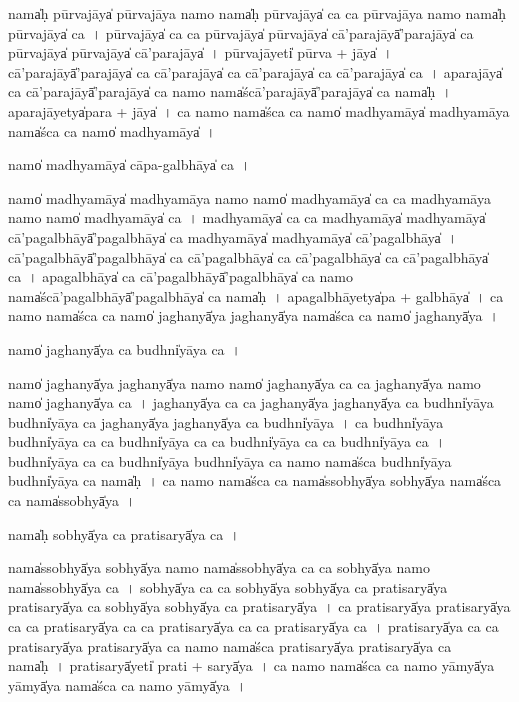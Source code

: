 \documentclass[parskip, DIV=14]{scrartcl}
\begin{document}
{nama̍ḥ pūrva॒jāya̍ pūrva॒jāya॒ namo॒ nama̍ḥ pūrva॒jāya̍ ca ca pūrva॒jāya॒ namo॒ nama̍ḥ pūrva॒jāya̍ ca~।
pū॒rva॒jāya̍ ca ca pūrva॒jāya̍ pūrva॒jāya̍ cā'para॒jāyā̍'para॒jāya̍ ca pūrva॒jāya̍ pūrva॒jāya̍ cā'para॒jāya̍~।
pū॒rva॒jāyeti̍ pūrva + jāya̍~।
cā॒'pa॒ra॒jāyā̍'para॒jāya̍ ca cā'para॒jāya̍ ca cā'para॒jāya̍ ca cā'para॒jāya̍ ca~।
a॒pa॒ra॒jāya̍ ca cā'para॒jāyā̍'para॒jāya̍ ca॒ namo॒ nama̍ścā'para॒jāyā̍'para॒jāya̍ ca॒ nama̍ḥ~।
a॒pa॒ra॒jāyetya̍para + jāya̍~।
ca॒ namo॒ nama̍śca ca॒ namo̍ madhya॒māya̍ madhya॒māya॒ nama̍śca ca॒ namo̍ madhya॒māya̍~।

namo̍ madhya॒māya̍ cāpa-ga॒lbhāya̍ ca॒~।

namo̍ madhya॒māya̍ madhya॒māya॒ namo॒ namo̍ madhya॒māya̍ ca ca madhya॒māya॒ namo॒ namo̍ madhya॒māya̍ ca~।
ma॒dhya॒māya̍ ca ca madhya॒māya̍ madhya॒māya̍ cā'paga॒lbhāyā̍'paga॒lbhāya̍ ca madhya॒māya̍ madhya॒māya̍ cā'paga॒lbhāya̍~।
cā॒'pa॒ga॒lbhāyā̍'paga॒lbhāya̍ ca cā'paga॒lbhāya̍ ca cā'paga॒lbhāya̍ ca cā'paga॒lbhāya̍ ca~।
a॒pa॒ga॒lbhāya̍ ca cā'paga॒lbhāyā̍'paga॒lbhāya̍ ca॒ namo॒ nama̍ścā'paga॒lbhāyā̍'paga॒lbhāya̍ ca॒ nama̍ḥ~।
a॒pa॒ga॒lbhāyetya̍pa + ga॒lbhāya̍~।
ca॒ namo॒ nama̍śca ca॒ namo̍ jagha॒nyā̍ya jagha॒nyā̍ya॒ nama̍śca ca॒ namo̍ jagha॒nyā̍ya~।

namo̍ jagha॒nyā̍ya ca॒ budhni̍yāya ca॒~।

namo̍ jagha॒nyā̍ya jagha॒nyā̍ya॒ namo॒ namo̍ jagha॒nyā̍ya ca ca jagha॒nyā̍ya॒ namo॒ namo̍ jagha॒nyā̍ya ca~।
ja॒gha॒nyā̍ya ca ca jagha॒nyā̍ya jagha॒nyā̍ya ca॒ budhni̍yāya॒ budhni̍yāya ca jagha॒nyā̍ya jagha॒nyā̍ya ca॒ budhni̍yāya~।
ca॒ budhni̍yāya॒ budhni̍yāya ca ca॒ budhni̍yāya ca ca॒ budhni̍yāya ca ca॒ budhni̍yāya ca~।
budhni̍yāya ca ca॒ budhni̍yāya॒ budhni̍yāya ca॒ namo॒ nama̍śca॒ budhni̍yāya॒ budhni̍yāya ca॒ nama̍ḥ~।
ca॒ namo॒ nama̍śca ca॒ nama̍sso॒bhyā̍ya so॒bhyā̍ya॒ nama̍śca ca॒ nama̍sso॒bhyā̍ya~।

nama̍ḥ so॒bhyā̍ya ca pratisa॒ryā̍ya ca॒~।

nama̍sso॒bhyā̍ya so॒bhyā̍ya॒ namo॒ nama̍sso॒bhyā̍ya ca ca so॒bhyā̍ya॒ namo॒ nama̍sso॒bhyā̍ya ca~।
so॒bhyā̍ya ca ca so॒bhyā̍ya so॒bhyā̍ya ca pratisa॒ryā̍ya pratisa॒ryā̍ya ca so॒bhyā̍ya so॒bhyā̍ya ca pratisa॒ryā̍ya~।                                                                                                                                  
ca॒ pra॒ti॒sa॒ryā̍ya pratisa॒ryā̍ya ca ca pratisa॒ryā̍ya ca ca pratisa॒ryā̍ya ca ca pratisa॒ryā̍ya ca~।
pra॒ti॒sa॒ryā̍ya ca ca pratisa॒ryā̍ya pratisa॒ryā̍ya ca॒ namo॒ nama̍śca pratisa॒ryā̍ya pratisa॒ryā̍ya ca॒ nama̍ḥ~।
pra॒ti॒sa॒ryā̍yeti̍ prati + sa॒ryā̍ya~।
ca॒ namo॒ nama̍śca ca॒ namo॒ yāmyā̍ya॒ yāmyā̍ya॒ nama̍śca ca॒ namo॒ yāmyā̍ya~।

}
\end{document}
